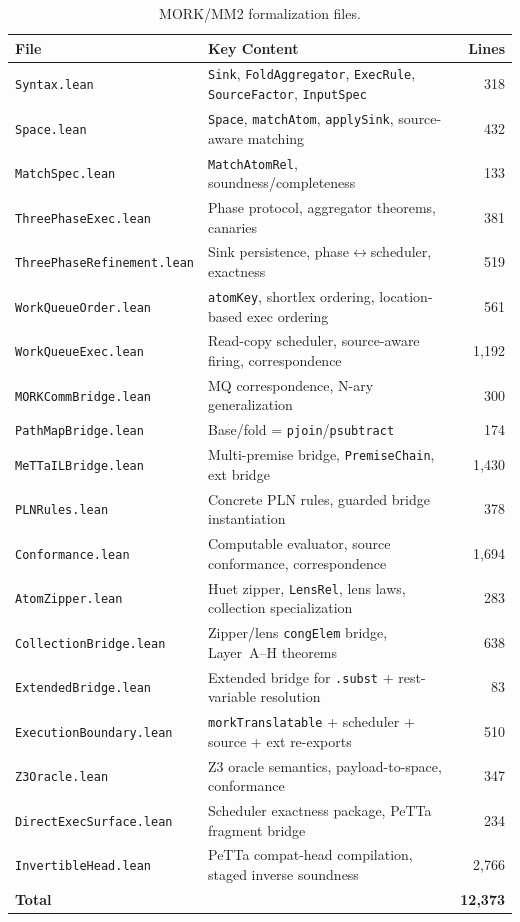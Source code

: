 \documentclass[11pt]{article}
\theoremstyle{definition}
\theoremstyle{remark}
\newcommand{\MORK}{\textup{MORK}}
\begin{document}
\begin{table}[ht]
\centering
\caption{\MORK{}/MM2 formalization files.}
\label{tab:morkfiles}
\begin{tabular}{@{}llr@{}}
\toprule
\textbf{File} & \textbf{Key Content} & \textbf{Lines} \\
\midrule
\texttt{Syntax.lean}              & \texttt{Sink}, \texttt{FoldAggregator}, \texttt{ExecRule}, \texttt{SourceFactor}, \texttt{InputSpec} & 318 \\
\texttt{Space.lean}               & \texttt{Space}, \texttt{matchAtom}, \texttt{applySink}, source-aware matching & 432 \\
\texttt{MatchSpec.lean}           & \texttt{MatchAtomRel}, soundness/completeness & 133 \\
\texttt{ThreePhaseExec.lean}      & Phase protocol, aggregator theorems, canaries & 381 \\
\texttt{ThreePhaseRefinement.lean}& Sink persistence, phase$\leftrightarrow$scheduler, exactness & 519 \\
\texttt{WorkQueueOrder.lean}      & \texttt{atomKey}, shortlex ordering, location-based exec ordering & 561 \\
\texttt{WorkQueueExec.lean}       & Read-copy scheduler, source-aware firing, correspondence & 1{,}192 \\
\texttt{MORKCommBridge.lean}      & MQ correspondence, N-ary generalization & 300 \\
\texttt{PathMapBridge.lean}       & Base/fold = \texttt{pjoin}/\texttt{psubtract} & 174 \\
\texttt{MeTTaILBridge.lean}       & Multi-premise bridge, \texttt{PremiseChain}, ext bridge & 1{,}430 \\
\texttt{PLNRules.lean}            & Concrete PLN rules, guarded bridge instantiation & 378 \\
\texttt{Conformance.lean}         & Computable evaluator, source conformance, correspondence & 1{,}694 \\
\texttt{AtomZipper.lean}          & Huet zipper, \texttt{LensRel}, lens laws, collection specialization & 283 \\
\texttt{CollectionBridge.lean}    & Zipper/lens \texttt{congElem} bridge, Layer~A--H theorems & 638 \\
\texttt{ExtendedBridge.lean}      & Extended bridge for \texttt{.subst} + rest-variable resolution & 83 \\
\texttt{ExecutionBoundary.lean}   & \texttt{morkTranslatable} + scheduler + source + ext re-exports & 510 \\
\texttt{Z3Oracle.lean}            & Z3 oracle semantics, payload-to-space, conformance & 347 \\
\texttt{DirectExecSurface.lean}   & Scheduler exactness package, PeTTa fragment bridge & 234 \\
\texttt{InvertibleHead.lean}      & PeTTa compat-head compilation, staged inverse soundness & 2{,}766 \\
\midrule
\textbf{Total} & & \textbf{12{,}373} \\
\bottomrule
\end{tabular}
\end{table}
\end{document}
